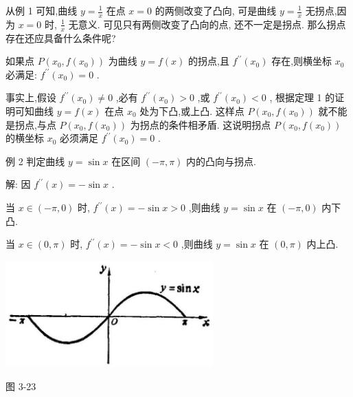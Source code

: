 \documentclass[lang=cn,newtx,10pt,scheme=chinese]{elegantbook}
\begin{document}
从例 1 可知,曲线 \(y = \frac{1}{x}\) 在点 \(x = 0\) 的两侧改变了凸向, 可是曲线 \(y = \frac{1}{x}\) 无拐点,因为 \(x = 0\) 时, \(\frac{1}{x}\) 无意义. 可见只有两侧改变了凸向的点, 还不一定是拐点. 那么拐点存在还应具备什么条件呢?

\begin{property}
如果点 \(P\left( {{x}_{0},f\left( {x}_{0}\right) }\right)\) 为曲线 \(y = f\left( x\right)\) 的拐点,且 \({f}^{\prime \prime }\left( {x}_{0}\right)\) 存在,则横坐标 \({x}_{0}\) 必满足: \({f}^{\prime \prime }\left( {x}_{0}\right) = 0\) .
\end{property}

事实上,假设 \({f}^{\prime \prime }\left( {x}_{0}\right) \neq 0\) ,必有 \({f}^{\prime \prime }\left( {x}_{0}\right) > 0\) ,或 \({f}^{\prime \prime }\left( {x}_{0}\right) < 0\) , 根据定理 1 的证明可知曲线 \(y = f\left( x\right)\) 在点 \({x}_{0}\) 处为下凸,或上凸. 这样点 \(P\left( {{x}_{0},f\left( {x}_{0}\right) }\right)\) 就不能是拐点,与点 \(P\left( {{x}_{0},f\left( {x}_{0}\right) }\right)\) 为拐点的条件相矛盾. 这说明拐点 \(P\left( {{x}_{0},f\left( {x}_{0}\right) }\right)\) 的横坐标 \({x}_{0}\) 必须满足 \({f}^{\prime \prime }\left( {x}_{0}\right) = 0\) .

例 2 判定曲线 \(y = \sin x\) 在区间 \(\left( {-\pi ,\pi }\right)\) 内的凸向与拐点.

解: 因 \({f}^{\prime \prime }\left( x\right) = - \sin x\) .

当 \(x \in \left( {-\pi ,0}\right)\) 时, \({f}^{\prime \prime }\left( x\right) = - \sin x > 0\) ,则曲线 \(y = \sin x\) 在 \(\left( {-\pi ,0}\right)\) 内下凸.

当 \(x \in \left( {0,\pi }\right)\) 时, \({f}^{\prime \prime }\left( x\right) = - \sin x < 0\) ,则曲线 \(y = \sin x\) 在 \(\left( {0,\pi }\right)\) 内上凸.

\begin{center}
\includegraphics[max width=0.6\textwidth]{images/01912c18-5c3f-733d-b775-749ba9897a9d_169_891522.jpg}
\end{center}

图 3-23
\end{document}
